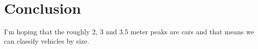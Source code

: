 \documentclass{article}
\begin{document}
    \begin{center}
    \end{center}
    { \hspace*{\fill} \\}

    \section{Conclusion}\label{conclusion}
    I'm hoping that the roughly 2, 3 and 3.5 meter peaks are cars and that
means we can classify vehicles by size.





    
\end{document}
